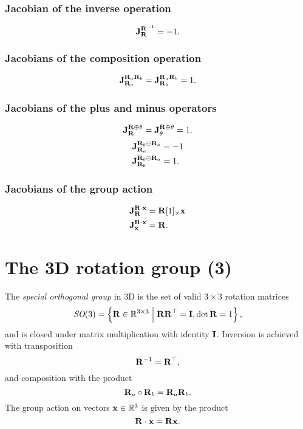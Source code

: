\subsubsection*{Jacobian of the inverse operation}
\begin{equation}
  \jac{\matR^{-1}}{\matR} = -1.
\end{equation}

\subsubsection*{Jacobians of the composition operation}
\begin{equation}
  \jac{\matR_a \matR_b}{\matR_a} = \jac{\matR_a \matR_b}{\matR_b} = 1.
\end{equation}

\subsubsection*{Jacobians of the plus and minus operators}
\begin{equation}
  \jac{\matR \oplus \theta}{\matR} = \jac{\matR \oplus \theta}{\theta} = 1.
\end{equation}
\begin{align}
  \jac{\matR_b \ominus \matR_a}{\matR_a} &= -1\\
  \jac{\matR_b \ominus \matR_a}{\matR_b} &= 1.
\end{align}

\subsubsection*{Jacobians of the group action}
\begin{align}
  \jac{\matR \cdot \vecx}{\matR} &= \matR [1]_\times \vecx\\
  \jac{\matR \cdot \vecx}{\vecx} &= \matR.
\end{align}

\section{The 3D rotation group \SO(3)} \label{sec:SO3_group}
The \emph{special orthogonal group} in 3D is the set of valid $3 \times 3$ rotation matrices
\begin{equation}
  \SO(3) = \left \{ \matR \in \bbR^{3 \times 3} \;\middle|\; \matR\matR\trans = \matI, \det \matR = 1 \right \},
\end{equation}
and is closed under matrix multiplication with identity $\matI$.
Inversion is achieved with transposition
\begin{equation}
  \matR^{-1} = \matR\trans,
\end{equation}
and composition with the product
\begin{equation}
  \matR_a \circ \matR_b = \matR_a \matR_b.
\end{equation}
The group action on vectors $\vecx \in \bbR^3$ is given by the product
\begin{equation} \label{eq:SO3-group-action}
  \matR \cdot \vecx = \matR \vecx.
\end{equation}

